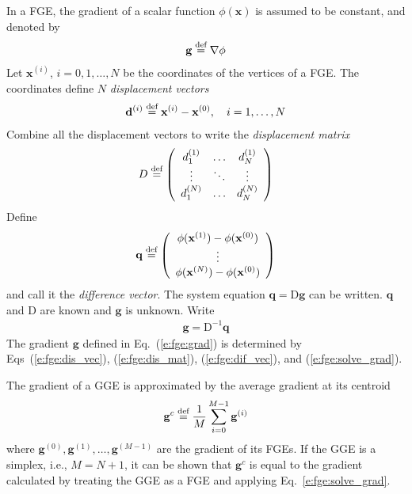 \documentclass[11pt,dvips]{article}
\numberwithin{equation}{section}
\newcommand{\defeq}{\ensuremath{\buildrel {\text{def}}\over{=}}}
\begin{document}
In a FGE, the gradient of a scalar function $\phi(\mathbf{x})$ is assumed to be
constant, and denoted by
\begin{align}
  \mathbf{g} \defeq \nabla\phi \label{e:fge:grad}
\end{align}
Let $\mathbf{x}^{(i)}$, $i = 0, 1, \ldots, N$ be the coordinates of the
vertices of a FGE.  The coordinates define $N$ \textit{displacement vectors}
\begin{align}
  \mathbf{d}^{(i)} \defeq \mathbf{x}^{(i)} - \mathbf{x}^{(0)},
  \quad i = 1, \ldots, N \label{e:fge:dis_vec}
\end{align}
Combine all the displacement vectors to write the \textit{displacement matrix}
\begin{align}
  D \defeq \left(\begin{array}{ccc}
    d^{(1)}_1 & \hdots & d^{(1)}_N \\
    \vdots & \ddots & \vdots \\
    d^{(N)}_1 & \hdots & d^{(N)}_N
  \end{array}\right) \label{e:fge:dis_mat}
\end{align}
Define
\begin{align}
  \mathbf{q} \defeq \left(\begin{array}{c}
    \phi(\mathbf{x}^{(1)}) - \phi(\mathbf{x}^{(0)}) \\
    \vdots \\
    \phi(\mathbf{x}^{(N)}) - \phi(\mathbf{x}^{(0)})
  \end{array}\right) \label{e:fge:dif_vec}
\end{align}
and call it the \textit{difference vector}.  The system equation $\mathbf{q} =
\mathrm{D}\mathbf{g}$ can be written.  $\mathbf{q}$ and $\mathrm{D}$ are known
and $\mathbf{g}$ is unknown.  Write
\begin{align}
  \mathbf{g} = \mathrm{D}^{-1}\mathbf{q} \label{e:fge:solve_grad}
\end{align}
The gradient $\mathbf{g}$ defined in Eq.~(\ref{e:fge:grad}) is determined by
Eqs~(\ref{e:fge:dis_vec}), (\ref{e:fge:dis_mat}), (\ref{e:fge:dif_vec}), and
(\ref{e:fge:solve_grad}).

The gradient of a GGE is approximated by the average gradient at its centroid
\begin{align}
  \mathbf{g}^c \defeq \frac{1}{M} \sum_{i=0}^{M-1} \mathbf{g}^{(i)}
  \label{e:gge:grad:centroid}
\end{align}
where $\mathbf{g}^{(0)}, \mathbf{g}^{(1)}, \ldots, \mathbf{g}^{(M-1)}$ are the
gradient of its FGEs.  If the GGE is a simplex, i.e., $M = N+1$, it can be
shown that $\mathbf{g}^c$ is equal to the gradient calculated by treating the
GGE as a FGE and applying Eq.~\ref{e:fge:solve_grad}.
\end{document}
